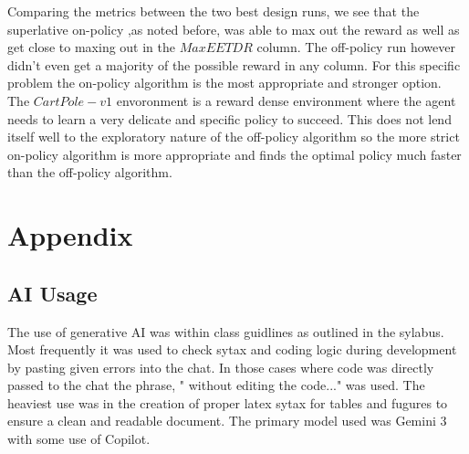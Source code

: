 \documentclass{article}
\begin{document}
\newline
Comparing the metrics between the two best design runs, we see that the superlative on-policy ,as noted before, was able to max out the reward as well as get close to maxing out in the $Max EETDR$ column. The off-policy run however didn't even get a majority of the possible reward in any column. 
\newline
For this specific problem the on-policy algorithm is the most appropriate and stronger option. The $CartPole-v1$ envoronment is a reward dense environment where the agent needs to learn a very delicate and specific policy to succeed. This does not lend itself well to the exploratory nature of the off-policy algorithm so the more strict on-policy algorithm is more appropriate and finds the optimal policy much faster than the off-policy algorithm.

\newpage
\section{Appendix}
\subsection{AI Usage}
The use of generative AI was within class guidlines as outlined in the sylabus. Most frequently it was used to check sytax and coding logic during development by pasting given errors into the chat. In those cases where code was directly passed to the chat  the phrase, " without editing the code..." was used. The heaviest use was in the creation of proper latex sytax for tables and fugures to ensure a clean and readable document. The primary model used was Gemini 3 with some use of Copilot.
\end{document}
